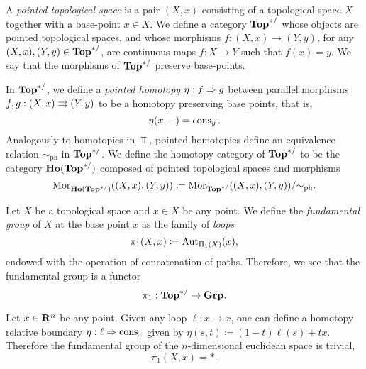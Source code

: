 \begin{definition}
\label{def:base-point-preserving-Top-cat}
A \emph{pointed topological space} is a pair \((X, x)\) consisting of a
topological space \(X\) together with a base-point \(x \in X\). We define a
category \({\textbf{Top}^{*/}}\) whose objects are pointed topological spaces, and whose
morphisms \(f: (X, x) \to (Y, y)\), for any \((X, x), (Y, y) \in {\textbf{Top}^{*/}}\), are
continuous maps \(f: X \to Y\) such that \(f(x) = y\). We say that the morphisms
of \({\textbf{Top}^{*/}}\) preserve base-points.

In \({\textbf{Top}^{*/}}\), we define a \emph{pointed homotopy} \(\eta: f \Rightarrow g\) between
parallel morphisms \(f, g: (X, x) \rightrightarrows (Y, y)\) to be a homotopy preserving
base points, that is,
\[
\eta(x, -) = \operatorname{cons}_y.
\]
Analogously to homotopies in \(\Top\), pointed homotopies define an equivalence
relation \(\sim_{\text{ph}}\) in \({\textbf{Top}^{*/}}\). We define the homotopy category of
\({\textbf{Top}^{*/}}\) to be the category \({\textbf{Ho}({\textbf{Top}^{*/}})}\) composed of pointed topological
spaces and morphisms
\[
\operatorname{Mor}_{{\textbf{Ho}({\textbf{Top}^{*/}})}}((X, x), (Y, y))
\coloneq \operatorname{Mor}_{{\textbf{Top}^{*/}}}((X, x), (Y, y))/{\sim_{\text{ph}}}.
\]
\end{definition}

\begin{definition}
\label{def:fundamental-group}
Let \(X\) be a topological space and \(x \in X\) be any point. We define
the \emph{fundamental group} of \(X\) at the base point \(x\) as the family of
\emph{loops}
\[
\pi_1(X, x) \coloneq \operatorname{Aut}_{\Pi_1(X)}(x),
\]
endowed with the operation of concatenation of paths. Therefore, we see that the
fundamental group is a functor
\[
\pi_1: {\textbf{Top}^{*/}} \to {\textbf{Grp}}.
\]
\end{definition}

\begin{example}
\label{exp:euclidean-space-pi1-is-trivial}
Let \(x \in \mathbf{R}^n\) be any point. Given any loop \(\ell: x \to x\), one can
define a homotopy relative boundary \(\eta: \ell \Rightarrow \operatorname{cons}_x\) given by
\(\eta(s, t) \coloneq (1 - t) \ell(s) + t x\). Therefore the fundamental group
of the \(n\)-dimensional euclidean space is trivial,
\[
\pi_1(X, x) = *.
\]
\end{example}

